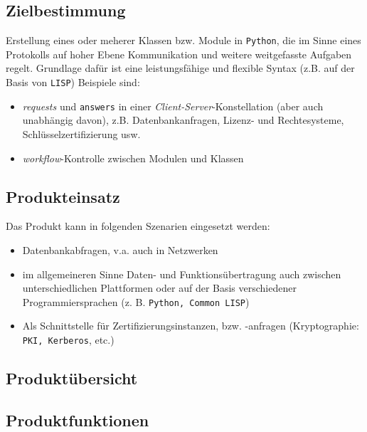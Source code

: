 \subsection{Zielbestimmung}

Erstellung eines oder meherer Klassen bzw. Module in \texttt{Python},
die im Sinne eines Protokolls auf hoher Ebene Kommunikation und
weitere weitgefasste Aufgaben regelt. Grundlage daf\"ur ist eine
leistungsf\"ahige und flexible Syntax (z.B. auf der Basis von
\texttt{LISP}) Beispiele sind:
\begin{itemize}
\item \textit{requests} und \texttt{answers} in einer
  \textit{Client-Server}-Konstellation (aber auch unabh\"angig davon),
  z.B. Datenbankanfragen, Lizenz- und Rechtesysteme,
  Schl\"usselzertifizierung usw.
  
\item \textit{workflow}-Kontrolle zwischen Modulen und Klassen

\end{itemize}

\subsection{Produkteinsatz}

Das Produkt kann in folgenden Szenarien eingesetzt werden:

\begin{itemize} 
  
\item Datenbankabfragen, v.a. auch in Netzwerken
  
\item im allgemeineren Sinne Daten- und Funktions\"ubertragung auch
  zwischen unterschiedlichen Plattformen oder auf der Basis
  verschiedener Programmiersprachen (z. B. \texttt{Python, Common
    LISP})
  
\item Als Schnittstelle f\"ur Zertifizierungsinstanzen, bzw. -anfragen
  (Kryptographie: \texttt{PKI, Kerberos}, etc.)

\end{itemize}

\subsection{Produkt\"ubersicht}


\subsection{Produktfunktionen}

